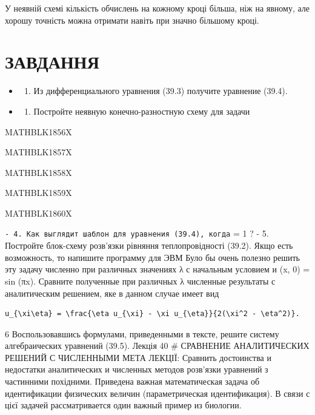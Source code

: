 \documentclass[
  ukrainian,
]{article}
\providecommand{\tightlist}{%
  \setlength{\itemsep}{0pt}\setlength{\parskip}{0pt}}
\begin{document}
У неявній схемі кількість обчислень на кожному кроці більша, ніж на
явному, але хорошу точність можна отримати навіть при значно більшому
кроці.

\section{ЗАВДАННЯ}\label{ux437ux430ux432ux434ux430ux43dux43dux44f-3}

\begin{itemize}
\tightlist
\item
  \begin{enumerate}
  \def\labelenumi{\arabic{enumi}.}
  \tightlist
  \item
    Из дифференциального уравнения (39.3) получите уравнение (39.4).
  \end{enumerate}
\item
  \begin{enumerate}
  \def\labelenumi{\arabic{enumi}.}
  \setcounter{enumi}{1}
  \tightlist
  \item
    Постройте неявную конечно-разностную схему для задачи
  \end{enumerate}
\end{itemize}

MATHBLK1856X

MATHBLK1857X

MATHBLK1858X

MATHBLK1859X

MATHBLK1860X

\texttt{-\ 4.\ Как\ выглядит\ шаблон\ для\ уравнения\ (39.4),\ когда}
\lambda = 1 ? - 5. Постройте блок-схему розв'язки рівняння
теплопровідності (39.2). Якщо есть возможность, то напишите программу
для ЭВМ Було бы очень полезно решить эту задачу численно при различных
значениях λ с начальным условием и (x, 0) = sin (πx). Сравните
полученные при различных λ численные результаты с аналитическим
решением, яке в данном случае имеет вид

\begin{verbatim}
u_{\xi\eta} = \frac{\eta u_{\xi} - \xi u_{\eta}}{2(\xi^2 - \eta^2)}.
\end{verbatim}

6 Воспользовавшись формулами, приведенными в тексте, решите систему
алгебраических уравнений (39.5). Лекція 40 \# СРАВНЕНИЕ АНАЛИТИЧЕСКИХ
РЕШЕНИЙ С ЧИСЛЕННЫМИ МЕТА ЛЕКЦІЇ: Сравнить достоинства и недостатки
аналитических и численных методов розв'язки уравнений з частинними
похідними. Приведена важная математическая задача об идентификации
физических величин (параметрическая идентификация). В связи с цієї
задачей рассматривается один важный пример из биологии.
\end{document}

